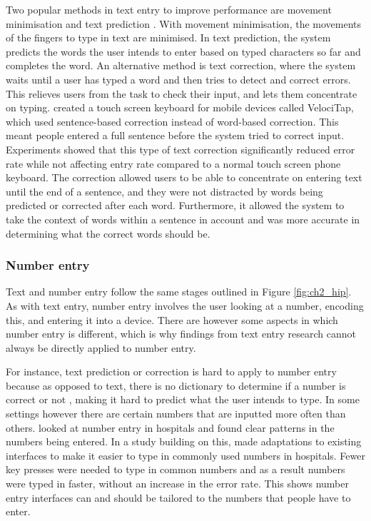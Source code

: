 Two popular methods in text entry to improve performance are movement minimisation and text prediction \citep{MacKenzie2002}. With movement minimisation, the movements of the fingers to type in text are minimised. In text prediction, the system predicts the words the user intends to enter based on typed characters so far and completes the word. An alternative method is text correction, where the system waits until a user has typed a word and then tries to detect and correct errors. This relieves users from the task to check their input, and lets them concentrate on typing. \citet{Vertanen2015} created a touch screen keyboard for mobile devices called VelociTap, which used sentence-based correction instead of word-based correction. This meant people entered a full sentence before the system tried to correct input. Experiments showed that this type of text correction significantly reduced error rate while not affecting entry rate compared to a normal touch screen phone keyboard. The correction allowed users to be able to concentrate on entering text until the end of a sentence, and they were not distracted by words being predicted or corrected after each word. Furthermore, it allowed the system to take the context of words within a sentence in account and was more accurate in determining what the correct words should be.

\subsubsection{Number entry}
Text and number entry follow the same stages outlined in Figure \ref{fig:ch2_hip}. As with text entry, number entry involves the user looking at a number, encoding this, and entering it into a device. There are however some aspects in which number entry is different, which is why findings from text entry research cannot always be directly applied to number entry.
 
For instance, text prediction or correction is hard to apply to number entry because as opposed to text, there is no dictionary to determine if a number is correct or not \citep{Wiseman2013a}, making it hard to predict what the user intends to type. In some settings however there are certain numbers that are inputted more often than others. \citet{Wiseman2013a} looked at number entry in hospitals and found clear patterns in the numbers being entered. In a study building on this, \citet{Wiseman2013b} made adaptations to existing interfaces to make it easier to type in commonly used numbers in hospitals. Fewer key presses were needed to type in common numbers and as a result numbers were typed in faster, without an increase in the error rate. This shows number entry interfaces can and should be tailored to the numbers that people have to enter. 

